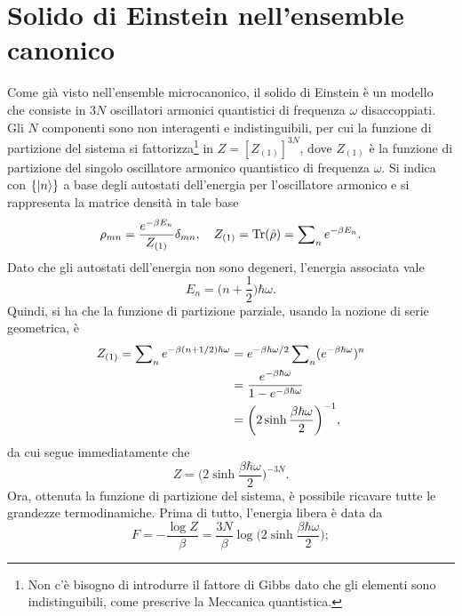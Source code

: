 \section{Solido di Einstein nell'ensemble canonico}
Come già visto nell'ensemble microcanonico, il solido di Einstein è un modello che consiste in $3N$ oscillatori armonici quantistici di frequenza $\omega$ disaccoppiati. Gli $N$ componenti sono non interagenti e indistinguibili, per cui la funzione di partizione del sistema si fattorizza\footnote{Non c'è bisogno di introdurre il fattore di Gibbs dato che gli elementi sono indistinguibili, come prescrive la Meccanica quantistica.} in $Z = [Z_{(1)}]^{3N}$, dove $Z_{(1)}$ è la funzione di partizione del singolo oscillatore armonico quantistico di frequenza $\omega$. Si indica con $\{\ket{n}\}$ a base degli autostati dell'energia per l'oscillatore armonico e si rappresenta la matrice densità in tale base
\begin{equation}
    \rho_{mn} = \frac{e^{-\beta E_n}} {Z_{(1)}}\delta_{mn},\quad Z_{(1)} = \mathrm{Tr}(\hat{\rho}) = \sum\nolimits_n e^{-\beta E_n}.
\end{equation}
Dato che gli autostati dell'energia non sono degeneri, l'energia associata vale
\begin{equation}
    E_n = \bigg(n + \frac{1}{2}\bigg)\hbar\omega.
\end{equation}
Quindi, si ha che la funzione di partizione parziale, usando la nozione di serie geometrica, è
\begin{equation}
\label{eq: funzione di partizione singola particella solido di Einstein (canonico)}
    \begin{split}
        Z_{(1)} = \sum\nolimits_n e^{-\beta(n + 1/2)\hbar\omega} &= e^{-\beta\hbar\omega/2}\sum\nolimits_n(e^{-\beta\hbar\omega})^n \\
        &= \frac{e^{-\beta\hbar\omega}}{1 - e^{-\beta\hbar\omega}} \\
        &= \bigg(2\sinh{\frac{\beta\hbar\omega}{2}}\bigg)^{-1},
    \end{split}
\end{equation}
da cui segue immediatamente che
\begin{equation}
    Z = \bigg(2\sinh{\frac{\beta\hbar\omega}{2}}\bigg)^{-3N}.
\end{equation}
Ora, ottenuta la funzione di partizione del sistema, è possibile ricavare tutte le grandezze termodinamiche. Prima di tutto, l'energia libera è data da
\begin{equation}
    F = -\frac{\log{Z}}{\beta} = \frac{3N}{\beta}\log{\bigg(2\sinh{\frac{\beta\hbar\omega}{2}}\bigg)};
\end{equation}
